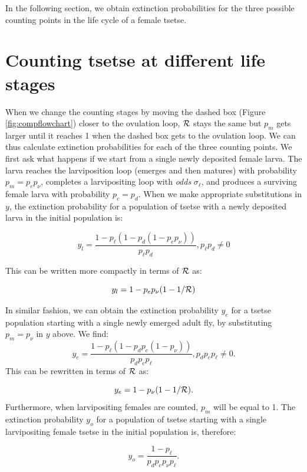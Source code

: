 \documentclass[smallextended]{svjour3}
\begin{document}
In the following section, we obtain extinction probabilities  for the three possible counting points in the life cycle of a female tsetse.

\section{Counting tsetse at different life stages}

When we change the counting stages by moving the dashed box (Figure \ref{fig:compflowchart}) closer to the ovulation loop, ${\cal R}$ stays the same but $p_m$ gets larger until it reaches 1 when the dashed box gets to the ovulation loop. We can thus calculate extinction probabilities for each of  the three counting points. We first ask what happens if we start from a single newly deposited female larva.
The larva reaches the larviposition loop (emerges and then matures) with probability $p_m = p_e p_{\nu}$, completes a larvipositing loop with \textit{odds} $\sigma_\ell$, and produces a surviving female larva with probability $p_c = p_d$. 
When we make appropriate substitutions in $y$, the extinction probability for a population of tsetse with a newly deposited larva in the initial population is:

$$y_l = \frac{1-p_{\ell}(1 - p_{d}(1 - p_{e}p_{\nu}))}{p_{\ell}p_{d}}, p_{\ell}p_{d} \neq 0$$

This can be written more compactly in terms of ${\cal R}$ as:

\begin{equation}
	\label{NewEqn2}
	y_l = 1 - p_ep_{\nu}(1-1/{\cal R})	
\end{equation}

In similar fashion, we can obtain the extinction probability $y_e$ for a tsetse population starting with a single newly emerged adult fly, by substituting  $p_m = p_{\nu}$ in $y$ above.
We find:
$$ y_e=\frac{1- p_{\ell}(1 -p_{d}p_{e}(1- p_{\nu}))}{p_{d}p_{e}p_{\ell}},  p_{d}p_{e}p_{\ell} \neq 0. $$ This can be rewritten in terms of ${\cal R}$ as:

\begin{equation}
	\label{NewEqn3}
	y_e = 1 - p_{\nu}(1-1/{\cal R}).	
\end{equation}
Furthermore, when  larvipositing females are counted, $p_m$ will be equal to 1. The extinction probability $y_o$ for a population of tsetse starting with a single larvipositing female tsetse in the initial population is, therefore:

$$y_o = \frac{1-p_{\ell}}{p_{d}p_{e}p_{\nu}p_{\ell}}.$$
\end{document}
